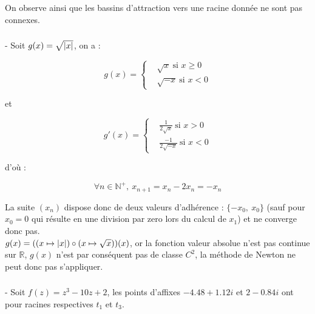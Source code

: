 \documentclass{article}
\DeclarePairedDelimiter\abs{\lvert}{\rvert}%
\begin{document}
On observe ainsi que les bassins d'attraction vers une racine donnée ne sont pas connexes.

\subsubsection{}

- Soit $g(x) = \sqrt{\abs{x}}$, on a :

\begin{equation*}
    g(x) = 
    \left \{
    \begin{aligned}
      & \sqrt{x} \ \text{si $x \geq 0$} \\
      & \sqrt{-x} \ \text{si $x < 0$}
    \end{aligned} \right.
\end{equation*} 

et

\begin{equation*}
    g'(x) = 
    \left \{
    \begin{aligned}
      & \frac{1}{2\sqrt{x}} \ \text{si $x > 0$} \\
      & \frac{-1}{2\sqrt{-x}} \ \text{si $x < 0$}
    \end{aligned} \right.
\end{equation*} 

d'où :

$$\forall n \in \mathbb{N}^{+}, \ x_{n + 1} = x_n - 2x_n = -x_n$$

La suite $(x_n)$ dispose donc de deux valeurs d'adhérence : $\{-x_0, \ x_0\}$
(sauf pour $x_0 = 0$ qui résulte en une division par zero lors du calcul de $x_1$) et ne converge donc pas. \\


$g(x) = ((x \mapsto \abs{x}) \circ (x \mapsto \sqrt{x}))(x)$, or la fonction 
valeur absolue n'est pas continue sur $\mathbb{R}$, $g(x)$ n'est par conséquent pas de classe $C^2$,
la méthode de Newton ne peut donc pas s'appliquer.

\subsubsection{}

- Soit $f(z) = z^3 - 10z + 2$, les points d'affixes $-4.48 + 1.12i$ et
$2 - 0.84i$ ont pour racines respectives $t_1$ et $t_3$.

\subsubsection{}
\end{document}
